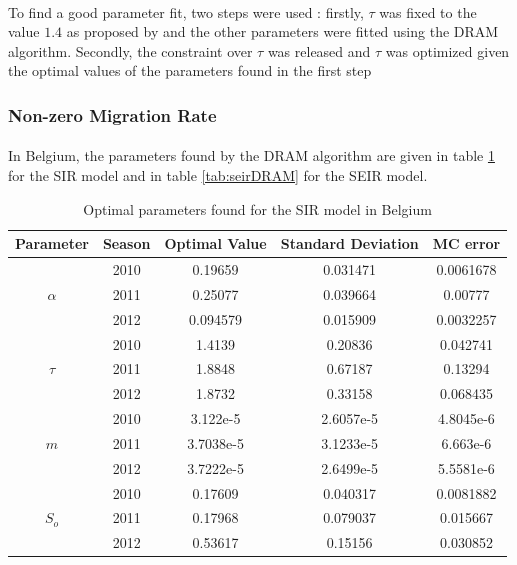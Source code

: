 \documentclass[11pt, a4paper]{article}
\begin{document}
\paragraph{}
To find a good parameter fit, two steps were used : firstly, $\tau$ was fixed to the value $1.4$ as proposed by \cite{coelho2011bayesian} and the other parameters were fitted using the DRAM algorithm. Secondly, the constraint over $\tau$ was released and $\tau$ was optimized given the optimal values of the parameters found in the first step

\subsubsection{Non-zero Migration Rate}
\paragraph{}
In Belgium, the parameters found by the DRAM algorithm are given in table \ref{tab:sirDRAM} for the SIR model and in table \ref{tab:seirDRAM} for the SEIR model.

\begin{table}[H]
\centering
\begin{tabular}{| c | c | c | c | c |}
    \hline
    Parameter & Season & Optimal Value &  Standard Deviation & MC error\\ \hline
    \multirow{3}{*}{$\alpha$} & 2010 & 0.19659 & 0.031471 & 0.0061678 \\
    & 2011 & 0.25077 & 0.039664 & 0.00777 \\
    & 2012 & 0.094579 & 0.015909 & 0.0032257 \\ \hline
    \multirow{3}{*}{$\tau$} & 2010 & 1.4139 & 0.20836 & 0.042741 \\ 
    & 2011 & 1.8848 & 0.67187 & 0.13294 \\ 
    & 2012 & 1.8732 & 0.33158 & 0.068435 \\ \hline
    \multirow{3}{*}{$m$} & 2010 & 3.122e-5 & 2.6057e-5 & 4.8045e-6 \\ 
    & 2011 & 3.7038e-5 & 3.1233e-5 & 6.663e-6 \\ 
    & 2012 & 3.7222e-5 & 2.6499e-5 & 5.5581e-6 \\ \hline
    \multirow{3}{*}{$S_o$} & 2010 & 0.17609 & 0.040317 & 0.0081882 \\
    & 2011 & 0.17968 & 0.079037 & 0.015667 \\ 
    & 2012 & 0.53617 & 0.15156 & 0.030852 \\ \hline
    \end{tabular}
    \caption{Optimal parameters found for the SIR model in Belgium}
    \label{tab:sirDRAM}
\end{table}
\end{document}
